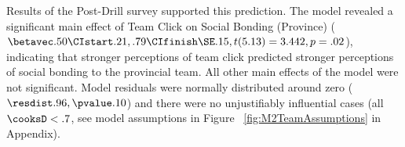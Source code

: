 \begin{CJK}{UTF8}{gbsn}







Results of the Post-Drill survey supported this prediction. The model revealed a significant main effect of Team Click on Social Bonding (Province) ($\betavec .50 \CIstart .21, .79 \CIfinish \SE .15, t(5.13) = 3.442, p = .02$), indicating that stronger perceptions of team click predicted stronger perceptions of social bonding to the provincial team.  All other main effects of the model were not significant.  Model residuals were normally distributed around zero ($\resdist .96, \pvalue .10$) and there were no unjustifiably influential cases (all $\cooksD < .7$, see model assumptions in Figure ~\ref{fig:M2TeamAssumptions} in Appendix).





\end{CJK}

